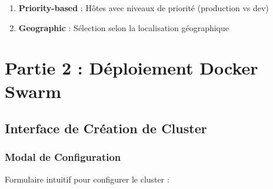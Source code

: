 \documentclass[12pt,a4paper]{article}
\begin{document}
\begin{warningbox}
\begin{enumerate}
    \item \textbf{Priority-based} : Hôtes avec niveaux de priorité (production vs dev)
    \item \textbf{Geographic} : Sélection selon la localisation géographique
\end{enumerate}
\end{warningbox}

\section{Partie 2 : Déploiement Docker Swarm}

\subsection{Interface de Création de Cluster}

\subsubsection{Modal de Configuration}

Formulaire intuitif pour configurer le cluster :
\end{document}

